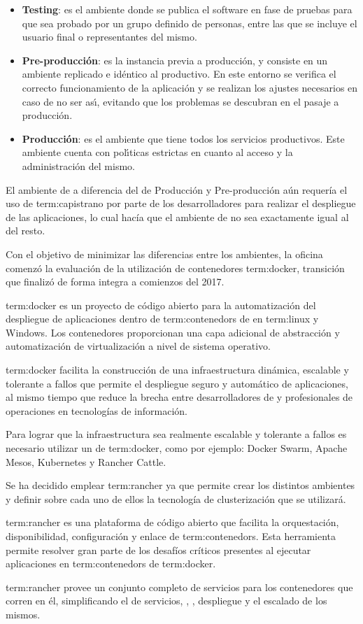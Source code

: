 \begin{itemize}
  \item \textbf{Testing}: es el ambiente donde se publica el software en fase
    de pruebas para que sea probado por un grupo definido de personas, entre
    las que se incluye el usuario final o representantes del mismo.
  \item \textbf{Pre-producción}: es la instancia previa a producción, y
    consiste en un ambiente replicado e idéntico al productivo. En este entorno
    se verifica el correcto funcionamiento de la aplicación y se realizan los
    ajustes necesarios en caso de no ser ası́, evitando que los problemas se
    descubran en el pasaje a producción.
  \item \textbf{Producción}: es el ambiente que tiene todos los servicios
    productivos. Este ambiente cuenta con polı́ticas estrictas en cuanto al
    acceso y la administración del mismo.
\end{itemize}

El ambiente de  a diferencia del de Producción y Pre-producción
aún requería el uso de \gls{term:capistrano} por parte de los desarrolladores para
realizar el despliegue de las aplicaciones, lo cual hacía que el ambiente de
 no sea exactamente igual al del resto.

Con el objetivo de minimizar las diferencias entre los ambientes, la oficina
comenzó la evaluación de la utilización de contenedores \gls{term:docker},
transición que finalizó de forma integra a comienzos del 2017.

\gls{term:docker} es un proyecto de código abierto para la automatización del
despliegue de aplicaciones dentro de \glspl{term:contenedor} de 
en \gls{term:linux} y Windows. Los contenedores proporcionan una capa adicional
de abstracción y automatización de virtualización a nivel de sistema operativo.

\gls{term:docker} facilita la construcción de una infraestructura dinámica,
escalable y tolerante a fallos que permite el despliegue seguro y automático
de aplicaciones, al mismo tiempo que reduce la brecha entre desarrolladores de
 y profesionales de operaciones en tecnologías de información.

Para lograr que la infraestructura sea realmente escalable y tolerante a fallos
es necesario utilizar un  de \gls{term:docker}, como por ejemplo:
Docker Swarm, Apache Mesos, Kubernetes y Rancher Cattle.

Se ha decidido emplear \gls{term:rancher} ya que permite crear los distintos
ambientes y definir sobre cada uno de ellos la tecnología de clusterización que
se utilizará.

\gls{term:rancher} es una plataforma de código abierto que facilita la
orquestación, disponibilidad, configuración y enlace de
\glspl{term:contenedor}. Esta herramienta permite resolver gran parte de los
desafíos críticos presentes al ejecutar aplicaciones en \glspl{term:contenedor}
de \gls{term:docker}.

\gls{term:rancher} provee un conjunto completo de servicios para los
contenedores que corren en él, simplificando el  de servicios,
, , despliegue y el escalado de los mismos.
